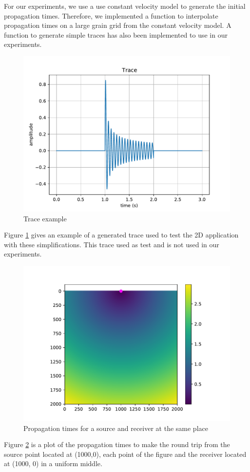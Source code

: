 For our experiments, we use a use constant velocity model to generate the initial propagation times.
Therefore, we implemented a function to interpolate propagation times on a large grain grid from the constant velocity model.
A function to generate simple traces has also been implemented to use in our experiments.

\begin{figure}[h]
	\centering
	\includegraphics[width=.7\textwidth]{trace}
	\caption{Trace example\label{fig:kirchhoff_trace}}
\end{figure}

Figure \ref{fig:kirchhoff_trace} gives an example of a generated trace used to test the 2D application with these simplifications.
This trace used as test and is not used in our experiments.

\begin{figure}[H]
	\centering
	\includegraphics[width=.7\textwidth]{trace1000ppt.pdf}
	\caption{Propagation times for a source and receiver at the same place\label{fig:kirchhoff_pt}}
\end{figure}

Figure \ref{fig:kirchhoff_pt} is a plot of the propagation times to make the round trip from the source point located at (1000,0), each point of the figure and the receiver located at (1000, 0) in a uniform middle.

